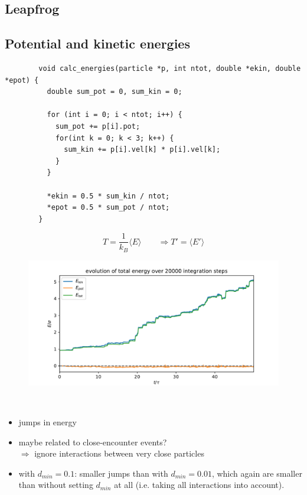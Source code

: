 \subsection{Leapfrog}

\subsection{Potential and kinetic energies}
    \begin{lstlisting}
        void calc_energies(particle *p, int ntot, double *ekin, double *epot) {
          double sum_pot = 0, sum_kin = 0;
        
          for (int i = 0; i < ntot; i++) {
            sum_pot += p[i].pot;
            for(int k = 0; k < 3; k++) {
              sum_kin += p[i].vel[k] * p[i].vel[k];
            }
          }
        
          *ekin = 0.5 * sum_kin / ntot;
          *epot = 0.5 * sum_pot / ntot;
        }\end{lstlisting}

    \begin{equation}
    	T=\frac{1}{k_B}\langle E\rangle \qquad
        \Rightarrow T'=\langle E'\rangle
    \end{equation}

    \begin{figure}[h!]
        \centering
        \includegraphics[width=\textwidth]{../figures/energy.pdf}
    \end{figure} \ \\ 
    \begin{itemize}
        \item jumps in energy
        \item maybe related to close-encounter events? \\
            $\Rightarrow$ ignore interactions between very close particles
        \item with $d_{min}=0.1$: smaller jumps than with $d_{min}=0.01$,
            which again are smaller than without setting $d_{min}$ at all 
            (i.e. taking all interactions into account).
    \end{itemize}

